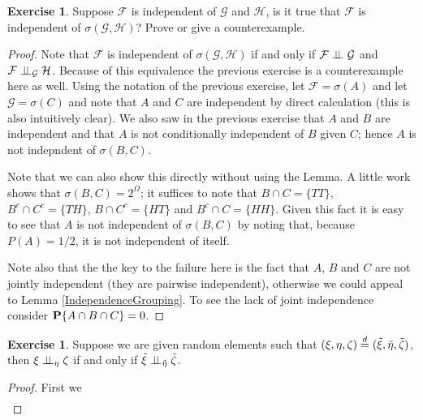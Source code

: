 \documentclass{amsart}
\theoremstyle{remark}
\theoremstyle{definition}
\newtheorem{ex}[thm]{Exercise}
\begin{document}
\begin{ex}Suppose $\mathcal{F}$ is independent of $\mathcal{G}$ and
  $\mathcal{H}$, is it true that $\mathcal{F}$ is independent of
  $\sigma(\mathcal{G}, \mathcal{H})$?  Prove or give a counterexample.
\end{ex}
\begin{proof}
Note that $\mathcal{F}$ is independent of
  $\sigma(\mathcal{G}, \mathcal{H})$ if and only if
  $\cindependent{\mathcal{F}}{\mathcal{G}}{}$
and $\cindependent{\mathcal{F}}{\mathcal{H}}{\mathcal{G}}$.  Because
of this equivalence the previous exercise is a counterexample here as
well.  Using the
notation of the previous exercise, let $\mathcal{F} = \sigma(A)$ and
let $\mathcal{G} = \sigma(C)$ and note that $A$ and $C$ are
independent
by direct calculation (this is also intuitively clear).  We also saw
in the previous exercise that $A$ and $B$ are independent and that $A$
is not conditionally independent of $B$ given $C$; hence $A$ is not
indepndent of $\sigma(B,C)$.

Note that we can also show this directly without using the Lemma. A
little work shows that $\sigma(B,C) = 2^\Omega$; it suffices to
note that $B \cap C = \lbrace TT \rbrace$,  $B^c \cap C^c = \lbrace TH
\rbrace$, $B \cap C^c = \lbrace HT \rbrace$ and $B^c \cap C = \lbrace HH
\rbrace$.  Given this fact
it is easy to see that $A$ is not independent of $\sigma(B,C)$ by noting that, because
$P(A) = 1/2$, it is not independent of itself.

Note also that the the key to the failure here is the fact that $A$, $B$
and $C$ are not jointly independent (they are pairwise independent),
otherwise we could appeal to Lemma \ref{IndependenceGrouping}.
To see the lack of joint independence consider $\probability {A \cap B
\cap C} = 0$.
\end{proof}

\begin{ex}Suppose we are given random elements such that $(\xi, \eta,
  \zeta) \eqdist (\tilde{\xi}, \tilde{\eta}, \tilde{\zeta})$, then
  $\cindependent{\xi}{\zeta}{\eta}$ if and only if $\cindependent{\tilde{\xi}}{\tilde{\zeta}}{\tilde{\eta}}$.
\end{ex}
\begin{proof}
First we 
\begin{align*}
\
\end{align*}
\end{proof}
\end{document}
